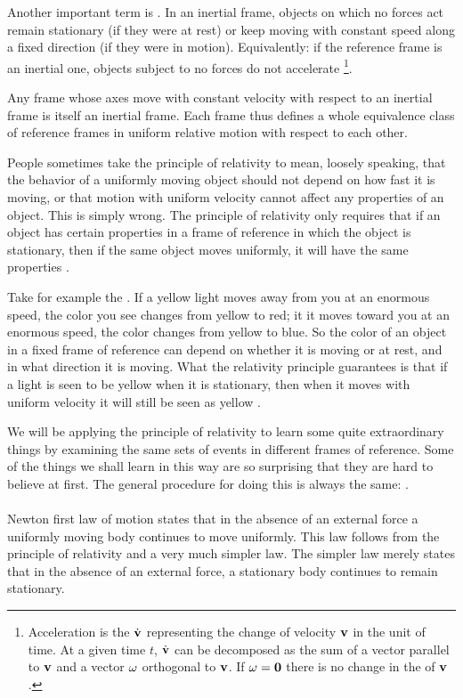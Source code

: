 Another important term is .  In an inertial frame, objects on which no forces act remain stationary (if they were at rest) or keep moving with constant speed along a fixed direction (if they were in motion). Equivalently: if the reference frame is an inertial one, objects subject to no forces do not accelerate
\footnote{Acceleration is the  $\dot{\vb{v}}$ representing the change of velocity $\vb{v}$ in the unit of time. At a given time $t$, $\dot{\vb{v}}$ can be decomposed as the sum of a vector parallel to $\vb{v}$ and a vector $\vb{\omega}$ orthogonal to $\vb{v}$. If $\vb{\omega} = \vb{0}$ there is no change in the  of $\vb{v}$.}.  

Any frame whose axes move with constant velocity with respect to an inertial frame is itself an inertial frame. Each frame thus defines a whole equivalence class of reference frames in uniform relative motion with respect to each other. 

People sometimes take the principle of relativity to mean, loosely speaking, that the behavior of a uniformly moving object should not depend on how fast it is moving, or that motion with uniform velocity cannot affect any properties of an object. This is simply wrong. The principle of relativity only requires that if an  object has certain properties in a frame of reference in which the object is stationary, then if the same object moves uniformly, it will have the same properties . 

Take for example the . If a yellow light moves away from you at an enormous speed, the color you see changes from yellow to red; it it moves toward you at an enormous speed, the color changes from yellow to blue. So the color of an object in a fixed frame of reference can depend on whether it is moving or at rest, and in what direction it is moving. What the relativity principle guarantees is that if a light is seen to be yellow when it is stationary, then when it moves with uniform velocity it will still be seen as yellow .

We will be applying the principle of relativity to learn some quite extraordinary things by examining the same sets of events in different frames of reference. Some of the things we shall learn in this way are so surprising that they are hard to believe at first. The general procedure for doing this is always the same: .
\\\\
Newton first law of motion states that in the absence of an external force a uniformly moving body continues to move uniformly. This law follows from the principle of relativity and a very much simpler law. The simpler law merely states that in the absence of an external force, a stationary body continues to remain stationary. 

